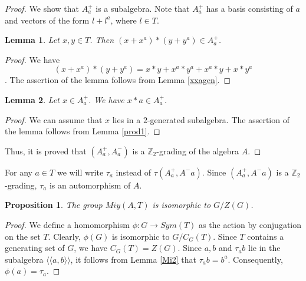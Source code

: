 \documentclass[12pt]{article}
\newcommand\Z{\mathbb{Z}}
\newcommand\la{\langle}
\newcommand\ra{\rangle}
\newcommand\lla{\la\!\la}
\newcommand\rra{\ra\!\ra}
\newtheorem{lem}{Lemma}
\newtheorem{prop}{Proposition}
\begin{document}
\begin{proof}
	 We show that $A_a^+$ is a subalgebra. Note that $A_a^+$ has a basis consisting of $a$ and vectors of the form $l+l^a$, where $l\in T$. 
	\begin{lem}\label{pp}
	 	Let $x,y\in T$. Then $(x+x^a)*(y+y^a)\in A^+_a$.
	\end{lem} 
	\begin{proof}
We have $$(x+x^a)*(y+y^a)=x*y+x^a*y^a+x^a*y+x*y^a$$.
The assertion of the lemma follows from Lemma \ref{xxagen}.
	\end{proof}

\begin{lem}\label{pa}
	Let $x\in A^+_a$. We have $x*a\in A^+_a$.
\end{lem}
\begin{proof}
We can assume that $x$ lies in a $2$-generated subalgebra. The assertion of the lemma follows from Lemma \ref{prod1}.
\end{proof}

Thus, it is proved that $(A^+_a,A^-_a)$ is a $\Z_2$-grading of the algebra $A$.
\end{proof}

For any $a\in T$ we will write $\tau_a$ instead of $\tau(A^+_a,A^-a)$. Since $(A^+_a,A^-a)$ is a $\Z_2$-grading, $\tau_a$ is an automorphism of $A$.

\begin{prop}\label{AMia}
The group $Miy(A,T)$ is isomorphic to $G/Z(G)$.
\end{prop}
\begin{proof}
We define a homomorphism $\phi:G \rightarrow Sym(T)$ as the action by conjugation on the set $T$. Clearly, $\phi(G)$ is isomorphic to $G/C_G(T)$. Since $T$ contains a generating set of $G$, we have $C_G(T)=Z(G)$. Since $a,b$ and $\tau_ab$ lie in the subalgebra $\lla a,b\rra$, it follows from Lemma \ref{Mi2} that $\tau_ab=b^a$. Consequently, $\phi(a)= \tau_a$.

\end{proof}
\end{document}

